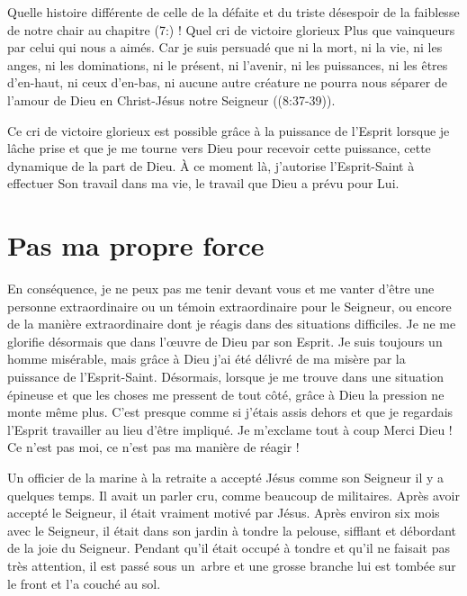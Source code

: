 Quelle histoire différente de celle de la défaite et du triste désespoir
 de la faiblesse de notre chair au chapitre (7:) !
 Quel cri de victoire glorieux\frcolon{}
 \Og Plus que vainqueurs par celui qui nous a aimés.
 Car je suis persuadé que ni la mort, ni la vie, ni les anges,
 ni les dominations, ni le présent, ni l'avenir, ni les puissances,
 ni les êtres d'en-haut, ni ceux d'en-bas, ni aucune autre créature
 ne pourra nous séparer de l'amour de Dieu en Christ-Jésus
 notre Seigneur \Fg{} ((8:37-39)).

Ce cri de victoire glorieux est possible grâce à la puissance de l'Es\-prit
 lorsque je lâche prise et que je me tourne vers Dieu pour recevoir
 cette puissance, cette dynamique de la part de Dieu. À ce moment là,
 j'autorise l'Esprit-Saint à effectuer Son travail dans ma vie,
 le travail que Dieu a prévu pour Lui.


\section{Pas ma propre force}

En conséquence, je ne peux pas me tenir devant vous
 et me vanter d'être une personne extraordinaire
 ou un témoin extraordinaire pour le Seigneur,
 ou encore de la manière extraordinaire dont je réagis dans des
 situations difficiles.
 Je ne me glorifie désormais que dans l'\oe{}uvre de Dieu par son Esprit.
 Je suis toujours un homme misérable, mais grâce à Dieu
 j'ai été délivré de ma misère par la puissance de l'Esprit-Saint.
 Désormais, lorsque je me trouve dans une situation épineuse
 et que les choses me pressent de tout côté, grâce à Dieu la pression
 ne monte même plus.
 C'est presque comme si j'étais assis dehors et que je regardais l'Esprit travailler
 au lieu d'être impliqué.
 Je m'exclame tout à coup\frcolon{}
 \Og Merci Dieu ! Ce n'est pas moi,
 ce n'est pas ma manière de réagir ! \Fg{}

Un officier de la marine à la retraite a accepté Jésus comme son Seigneur
 il y a quelques temps.
 Il avait un parler cru, comme beaucoup de militaires.
 Après avoir accepté le Seigneur, il était vraiment motivé par Jésus.
 Après environ six mois avec le Seigneur, il était dans son jardin
 à tondre la pelouse, sifflant et débordant
 de la joie du Seigneur.
 Pendant qu'il était occupé à tondre et qu'il ne faisait pas très attention,
 il est passé sous un~arbre et une grosse branche lui est tombée sur le front
 et l'a couché au sol.

